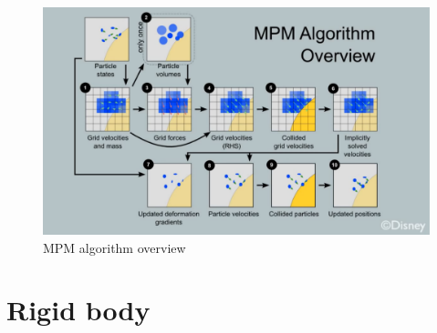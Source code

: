 \begin{itemize}
\begin{figure}[h!]
\label{mpm}
\centering
\includegraphics[width=\textwidth]{img/MPM}
\caption{MPM algorithm overview}
\end{figure}

\section{Rigid body}


\end{itemize}
